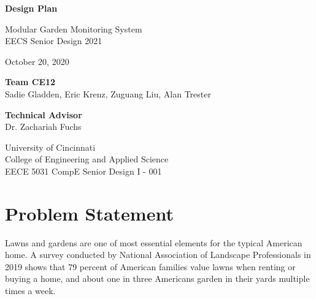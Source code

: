 \documentclass{report}
\begin{document}
\begin{titlepage}
    \begin{center}
        \vspace*{1cm}

        \Huge
        \textbf{Design Plan}

        \vspace{1.5cm}
        \Large
        Modular Garden Monitoring System\\
        EECS Senior Design 2021

        \vspace{0.5cm}
        October 20, 2020

        \vspace{1.5cm}

        \textbf{Team CE12} \\
        {\Large Sadie Gladden, Eric Krenz, Zuguang Liu, Alan Trester}

        \vspace{1.5cm}
        \textbf{Technical Advisor} \\
        {\Large Dr. Zachariah Fuchs}

        \vfill

        University of Cincinnati\\
        College of Engineering and Applied Science\\
        EECE 5031 CompE Senior Design I - 001

        \vspace{0.8cm}
    \end{center}
\end{titlepage}

\tableofcontents

\chapter{Problem Statement}

Lawns and gardens are one of most essential elements for the typical American home. A survey conducted by National Association of Landscape Professionals in 2019 shows that 79 percent of American families value lawns when renting or buying a home, and about one in three Americans garden in their yards multiple times a week\cite{noauthor_new_2019}. \\
\end{document}
